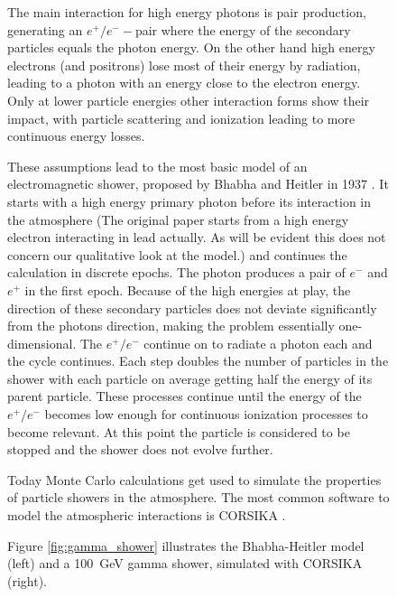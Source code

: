 \begin{figure}
The main interaction for high energy photons is pair 
production, generating an $e^+/e^--$pair where the energy of 
the secondary particles equals the photon energy.
On the other hand high energy electrons (and positrons) lose 
most of their energy by radiation, leading to a photon with 
an energy close to the electron energy.
Only at lower particle energies other interaction forms show their impact,
with particle scattering and ionization 
leading to more continuous energy losses.

These assumptions lead to the most basic model of an 
electromagnetic shower, proposed by Bhabha and Heitler in 1937
\cite{doi:10.1098/rspa.1937.0082}.
It starts with a high energy primary photon before its interaction in the atmosphere 
(The original paper starts from a high energy electron interacting in lead actually.
As will be evident this does not concern our qualitative look at the model.) and continues 
the calculation in discrete epochs.
The photon produces a pair of $e^-$ and $e^+$ in the first epoch.
Because of the high energies at play, the direction of these secondary 
particles does not deviate significantly from the photons direction, 
making the problem essentially one-dimensional.
The $e^+/e^-$ continue on to radiate a photon each and the cycle continues.
Each step doubles the number of particles in the shower with each particle 
on average getting half the energy of its parent particle.
These processes continue until the energy of the $e^+/e^-$ becomes low enough for
continuous ionization processes to become relevant.
At this point the particle is considered to be stopped and the shower
does not evolve further.

Today Monte Carlo calculations get used to simulate the properties 
of particle showers in the atmosphere.
The most common software to model the atmospheric interactions is
CORSIKA \cite{Engel:2018akg}.

Figure \ref{fig:gamma_shower} illustrates the Bhabha-Heitler model (left)
and a \SI{100}{\giga\electronvolt} gamma shower, simulated with CORSIKA (right).


\end{figure}
